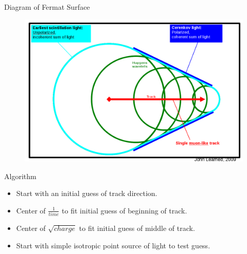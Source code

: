 \documentclass{beamer} %
\begin{document}
\begin{frame}{Diagram of Fermat Surface}
	\begin{figure}
		\includegraphics[width=\textwidth,height=0.7\textheight,keepaspectratio]
			{material/fermat_surface_diagram.png}
	\end{figure}
\end{frame}

\begin{frame}{Algorithm}
	\begin{itemize}
		\item Start with an initial guess of track direction.
		\item Center of $\frac{1}{time}$ to fit initial guess of beginning of track.
		\item Center of $\sqrt{charge}$ to fit initial guess of middle of track.
		\item Start with simple isotropic point source of light to test guess.
	\end{itemize}
\end{frame}
\end{document}
